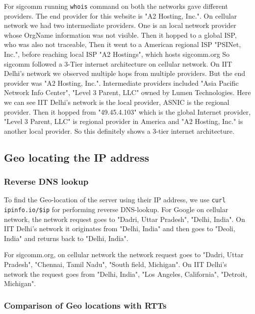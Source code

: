 \documentclass{article}
\begin{document}
\noindent
For sigcomm running \verb|whois| command on both the networks gave different providers. The end provider for this website is "A2 Hosting, Inc.". On cellular network we had two intermediate providers. One is an local network provider whose OrgName information was not visible. Then it hopped to a global ISP, who was also not traceable, Then it went to a American regional ISP "PSINet, Inc.", before reaching local ISP "A2 Hostings", which hosts sigcomm.org  So sigcomm followed a 3-Tier internet architecture on cellular network. On IIT Delhi's network we observed multiple hops from multiple providers. But the end provider was "A2 Hosting, Inc.". Intermediate providers included "Asia Pacific Network Info Center", "Level 3 Parent, LLC" owned by Lumen Technologies. Here we can see IIT Delhi's network is the local provider, ASNIC is the regional provider. Then it hopped from "49.45.4.103" which is the global Internet provider, "Level 3 Parent, LLC" is regional provider in America and "A2 Hosting, Inc." is another local provider. So this definitely shows a 3-tier internet architecture.

\subsection{Geo locating the IP address}
\subsubsection{Reverse DNS lookup}

\noindent
To find the Geo-location of the server using their IP address, we use \verb|curl ipinfo.io/$ip| for performing reverse DNS-lookup. For Google on cellular network, the network request goes to "Dadri, Uttar Pradesh", "Delhi, India". On IIT Delhi's network it originates from "Delhi, India" and then goes to "Deoli, India" and returns back to "Delhi, India". 

\noindent
For sigcomm.org, on cellular network the network request goes to "Dadri, Uttar Pradesh", "Chennai, Tamil Nadu", "South field, Michigan". On IIT Delhi's network the request goes from "Delhi, India", "Los Angeles, California", "Detroit, Michigan". 
\subsubsection{Comparison of Geo locations with RTTs}
\end{document}
